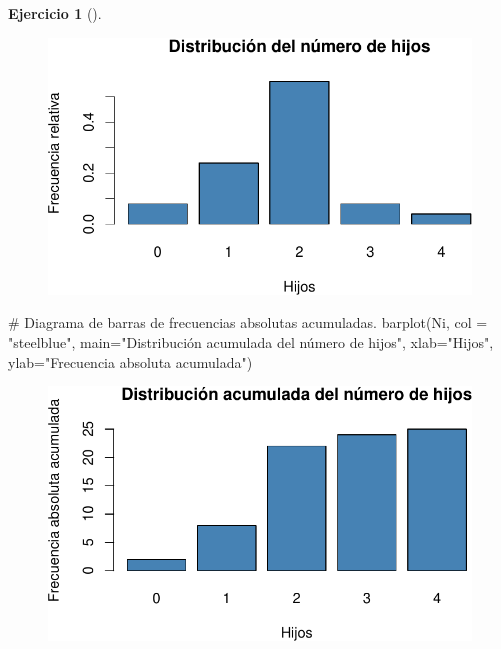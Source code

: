 \documentclass[
  a4paper,
]{scrreport}
\newenvironment{Shaded}{\begin{snugshade}}{\end{snugshade}}
\newcommand{\AttributeTok}[1]{\textcolor[rgb]{0.40,0.45,0.13}{#1}}
\newcommand{\CommentTok}[1]{\textcolor[rgb]{0.37,0.37,0.37}{#1}}
\newcommand{\FunctionTok}[1]{\textcolor[rgb]{0.28,0.35,0.67}{#1}}
\newcommand{\NormalTok}[1]{\textcolor[rgb]{0.00,0.23,0.31}{#1}}
\newcommand{\StringTok}[1]{\textcolor[rgb]{0.13,0.47,0.30}{#1}}
\theoremstyle{definition}
\newtheorem{exercise}{Ejercicio}[chapter]
\theoremstyle{remark}
\begin{document}
\begin{exercise}[]
\begin{tcolorbox}
\begin{figure}[H]

{\centering \includegraphics{./03-frecuencias-graficos_files/figure-pdf/unnamed-chunk-6-2.pdf}

}

\end{figure}

\begin{Shaded}
\begin{Highlighting}[]
\CommentTok{\# Diagrama de barras de frecuencias absolutas acumuladas.}
\FunctionTok{barplot}\NormalTok{(Ni, }\AttributeTok{col =} \StringTok{"steelblue"}\NormalTok{, }\AttributeTok{main=}\StringTok{"Distribución acumulada del número de hijos"}\NormalTok{, }\AttributeTok{xlab=}\StringTok{"Hijos"}\NormalTok{, }\AttributeTok{ylab=}\StringTok{"Frecuencia absoluta acumulada"}\NormalTok{)}
\end{Highlighting}
\end{Shaded}

\begin{figure}[H]

{\centering \includegraphics{./03-frecuencias-graficos_files/figure-pdf/unnamed-chunk-6-3.pdf}

}
\end{figure}
\end{tcolorbox}
\end{exercise}
\end{document}
